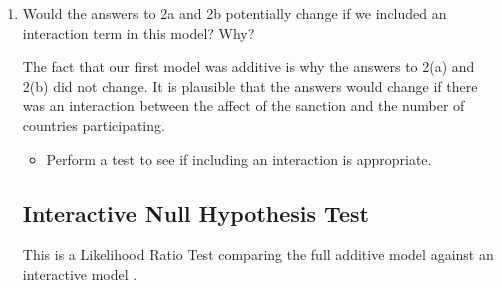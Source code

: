 \documentclass[12pt,letterpaper]{article}
\begin{document}
\begin{enumerate}
\begin{enumerate}
	$\beta_{\text{sanctions}(15\%)} - \beta_{\text{sanctions}(5\%)} = -0.1332 - 0.1919 = -0.3251$
	\vspace{.5cm}
	
	The log odds decrease by $-0.325$  giving us a odds ratio of $e^{-0.3251} = 0.7224$.
	
	A decrease of $ (1 - 0.7224) \approx 28\%$ of support moving from sanctions of $5\%$ to sanctions of $15\%$.
	
	
	
		
		\item
		What is the estimated probability that an individual will support a policy if there are 80 of 192 countries participating with no sanctions? 
		
	
	$$\log\left(\frac{p}{1-p}\right) = -0.2727 + 0.3364(1) + 0 = 0.0637$$
	
	
$$\hat{p} = \frac{e^{0.0637}}{1 + e^{0.0637}} = \frac{1.0657}{2.0657} \approx 0.5159$$

And, to verify -- 

 

	
	 
		
		
	
	\end{enumerate}
	\item
	Would the answers to 2a and 2b potentially change if we included an interaction term in this model? Why? 
	
	The fact that our first model was additive is why the answers to 2(a) and 2(b) did not change.  It is plausible that the answers would change if there was an  interaction between the affect of the sanction and the number of countries participating.
	\begin{itemize}
		\item Perform a test to see if including an interaction is appropriate.
	\end{itemize}
	
	 
	\vspace{.5cm}	
	
	
	\subsection*{Interactive Null Hypothesis Test}
	
	This is a Likelihood Ratio Test comparing the full additive model against an interactive model .
	

\end{enumerate}
\end{document}
